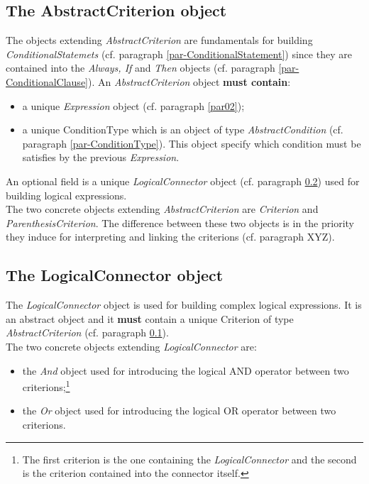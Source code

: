 \documentclass[a4paper,11pt] {article}
\begin{document}
\subsection{The AbstractCriterion object}\label{par-AbstractCriterion}
The objects extending {\it AbstractCriterion} are fundamentals for building {\it ConditionalStatemets} (cf. paragraph \ref{par-ConditionalStatement}) since they are contained into the {\it Always, If} and {\it Then} objects (cf. paragraph \ref{par-ConditionalClause}).
An {\it AbstractCriterion} object {\bf must contain}:
\begin{itemize}
\item a unique {\it Expression} object (cf. paragraph \ref{par02});
\item a unique ConditionType which is an object of type {\it AbstractCondition} (cf. paragraph  \ref{par-ConditionType}).
This object specify which condition must be satisfies by the previous {\it Expression}.
\end{itemize}
An optional field is a unique {\it LogicalConnector} object (cf. paragraph \ref{par-LogicalConnector}) used for building logical expressions.\\

The two concrete objects extending  {\it AbstractCriterion}  are {\it Criterion} and {\it ParenthesisCriterion}. The difference between these two objects is in the priority they induce for interpreting and linking the criterions (cf. paragraph XYZ).

\subsection{The LogicalConnector object}\label{par-LogicalConnector}
The {\it LogicalConnector} object is used for building complex logical expressions. It is an abstract object and it {\bf must} contain a unique Criterion of type {\it AbstractCriterion} (cf. paragraph \ref{par-AbstractCriterion}).\\
The two concrete objects extending {\it LogicalConnector} are:
\begin{itemize}
\item the {\it And} object used for introducing the logical AND operator between two criterions;\footnote{The first criterion is the one containing the {\it LogicalConnector} and the second is the criterion contained into the connector itself.}
\item the {\it Or} object used for introducing the logical OR operator between two criterions.
\end{itemize}
\end{document}
